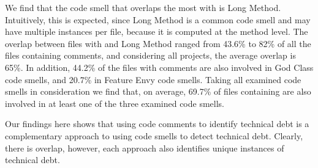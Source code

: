 We find that the code smell that overlaps the most with \SATD is Long Method. Intuitively, this is expected, since Long Method is a common code smell and may have multiple instances per file, because it is computed at the method level. The overlap between files with \SATD and Long Method ranged from 43.6\% to 82\% of all the files containing \SATD comments, and considering all projects, the average overlap is 65\%. In addition, 44.2\% of the files with \SATD comments are also involved in God Class code smells, and 20.7\% in Feature Envy code smells. Taking all examined code smells in consideration we find that, on average, 69.7\% of files containing \SATD are also involved in at least one of the three examined code smells. 

Our findings here shows that using code comments to identify technical debt is a complementary approach to using code smells to detect technical debt. Clearly, there is overlap, however, each approach also identifies unique instances of technical debt.

